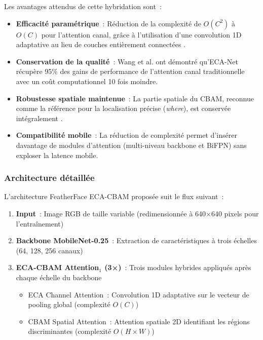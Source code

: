 \begin{onehalfspace}
\hspace{0.65 cm}Les avantages attendus de cette hybridation sont~:

\begin{itemize}
\item \textbf{Efficacité paramétrique}~: Réduction de la complexité de $O(C^2)$ à $O(C)$ pour l'attention canal, grâce à l'utilisation d'une convolution 1D adaptative au lieu de couches entièrement connectées \cite{Wang2020ECANet}.

\item \textbf{Conservation de la qualité}~: Wang et al. \cite{Wang2020ECANet} ont démontré qu'ECA-Net récupère 95\% des gains de performance de l'attention canal traditionnelle avec un coût computationnel 10 fois moindre.

\item \textbf{Robustesse spatiale maintenue}~: La partie spatiale du CBAM, reconnue comme la référence pour la localisation précise (\textit{where}), est conservée intégralement \cite{Woo2018CBAM}.

\item \textbf{Compatibilité mobile}~: La réduction de complexité permet d'insérer davantage de modules d'attention (multi-niveau backbone et BiFPN) sans exploser la latence mobile.
\end{itemize}

\subsubsection{Architecture détaillée}

\hspace{0.65 cm}L'architecture FeatherFace ECA-CBAM proposée suit le flux suivant~:

\begin{enumerate}
\item \textbf{Input}~: Image RGB de taille variable (redimensionnée à 640×640 pixels pour l'entraînement)

\item \textbf{Backbone MobileNet-0.25}~: Extraction de caractéristiques à trois échelles (64, 128, 256 canaux)

\item \textbf{ECA-CBAM Attention$_1$ (3×)}~: Trois modules hybrides appliqués après chaque échelle du backbone
   \begin{itemize}
   \item ECA Channel Attention~: Convolution 1D adaptative sur le vecteur de pooling global (complexité $O(C)$)
   \item CBAM Spatial Attention~: Attention spatiale 2D identifiant les régions discriminantes (complexité $O(H \times W)$)
   \end{itemize}


\end{enumerate}
\end{onehalfspace}
